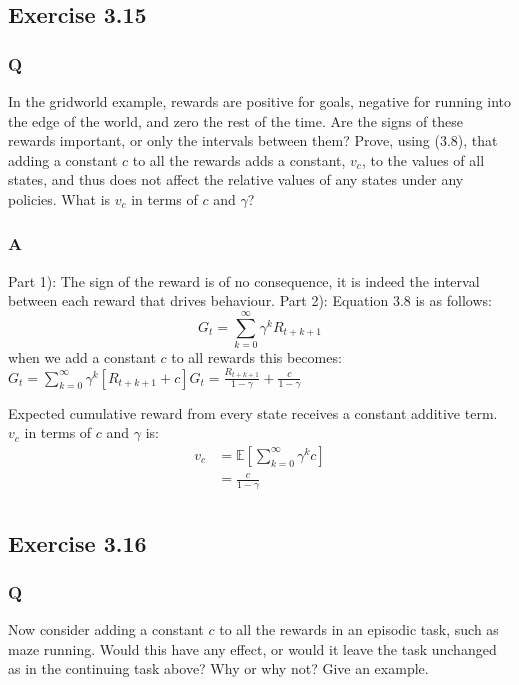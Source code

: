 \subsection{Exercise 3.15}
\subsubsection*{Q}
In the gridworld example, rewards are positive for goals, negative for running into the edge of the world, and zero the rest of the time. Are the signs of these rewards important, or only the intervals between them? Prove, using (3.8), that adding a constant $c$ to all the rewards adds a constant, $v_c$, to the values of all states, and thus does not affect the relative values of any states under any policies. What is $v_c$ in terms of $c$ and $\gamma$? 

\subsubsection*{A}
Part 1): The sign of the reward is of no consequence, it is indeed the interval between each reward that drives behaviour.
Part 2): Equation 3.8 is as follows:
\begin{equation}
G_t = \sum_{k=0}^{\infty} \gamma^k R_{t+k+1}
\end{equation}
when we add a constant $c$ to all rewards this becomes:
$
G_t = \sum_{k=0}^{\infty} \gamma^k [R_{t+k+1} + c]
G_t = \frac{R_{t+k+1}}{1 - \gamma} + \frac{c}{1 - \gamma}
$

Expected cumulative reward from every state receives a constant additive term. \(v_c\) in terms of $c$ and $\gamma$ is:
\begin{align}
v_c &= \mathbb{E}\left[\sum_{k=0}^{\infty}\gamma^k c\right]\\
&= \frac{c}{1 - \gamma}\\
\end{align}

\subsection{Exercise 3.16}
\subsubsection*{Q}
Now consider adding a constant $c$ to all the rewards in an episodic task, such as maze running. Would this have any effect, or would it leave the task unchanged as in the continuing task above? Why or why not? Give an example. 

